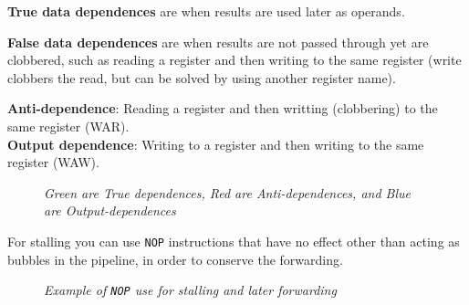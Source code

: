 \documentclass[11pt]{article}
\begin{document}
\textbf{True data dependences} are when results are used later as operands.

\textbf{False data dependences} are when results are not passed through yet are clobbered, such as reading a register and then writing to the same register (write clobbers the read, but can be solved by using another register name).

\begin{tcolorbox}[
    enhanced,
    attach boxed title to top left={xshift=6mm,yshift=-1.5mm},
    colback=moonstoneblue!20,
    colframe=moonstoneblue,
    colbacktitle=moonstoneblue,
    title=Types of False Data Dependences,
    fonttitle=\bfseries\color{white},
    boxed title style={size=small,colframe=moonstoneblue,sharp corners},
    sharp corners,
    label=box:logic-types,
]
    {\color{moondark}\textbf{Anti-dependence}}: Reading a register and then writting (clobbering) to the same register (WAR). \\
    {\color{moondark}\textbf{Output dependence}}: Writing to a register and then writing to the same register (WAW).
\end{tcolorbox}

\pagebreak
\begin{figure}[htbp]
    \centering
    \caption{\textit{Green are True dependences, Red are Anti-dependences, and Blue are Output-dependences}}
\end{figure}

For stalling you can use \texttt{NOP} instructions that have no effect other than acting as bubbles in the pipeline, in order to conserve the forwarding.

\begin{figure}[htbp]
    \centering
    \caption{\textit{Example of \texttt{NOP} use for stalling and later forwarding}}
\end{figure}
\end{document}
